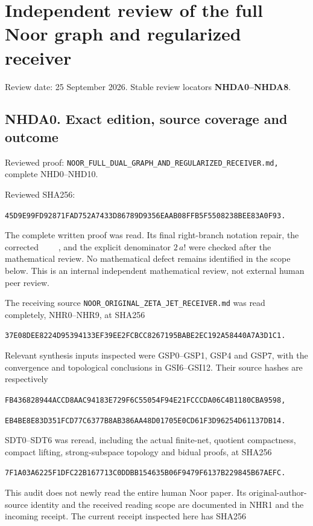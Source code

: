 \section{Independent review of the full Noor graph and regularized
receiver}\label{independent-review-of-the-full-noor-graph-and-regularized-receiver}

Review date: 25 September 2026. Stable review locators
\textbf{NHDA0--NHDA8}.

\subsection{NHDA0. Exact edition, source coverage and
outcome}\label{nhda0.-exact-edition-source-coverage-and-outcome}

Reviewed proof:
\nolinkurl{NOOR_FULL_DUAL_GRAPH_AND_REGULARIZED_RECEIVER.md,} complete
NHD0--NHD10.

Reviewed SHA256:

\nolinkurl{45D9E99FD92871FAD752A7433D86789D9356EAAB08FFB5F5508238BEE83A0F93.}

The complete written proof was read. Its final right-branch notation
repair, the corrected \(\qquad\), and the explicit denominator \(2\,a!\)
were checked after the mathematical review. No mathematical defect
remains identified in the scope below. This is an internal independent
mathematical review, not external human peer review.

The receiving source \nolinkurl{NOOR_ORIGINAL_ZETA_JET_RECEIVER.md} was
read completely, NHR0--NHR9, at SHA256

\nolinkurl{37E08DEE8224D95394133EF39EE2FCBCC8267195BABE2EC192A58440A7A3D1C1.}

Relevant synthesis inputs inspected were GSP0--GSP1, GSP4 and GSP7, with
the convergence and topological conclusions in GSI6--GSI12. Their source
hashes are respectively

\nolinkurl{FB436828944ACCD8AAC94183E729F6C55054F94E21FCCCDA06C4B1180CBA9598,}

\nolinkurl{EB4BE8E83D351FCD77C6377B8AB386AA48D01705E0CD61F3D96254D61137DB14.}

SDT0--SDT6 was reread, including the actual finite-net, quotient
compactness, compact lifting, strong-subspace topology and bidual
proofs, at SHA256

\nolinkurl{7F1A03A6225F1DFC22B167713C0DDBB154635B06F9479F6137B229845B67AEFC.}

This audit does not newly read the entire human Noor paper. Its
original-author-source identity and the received reading scope are
documented in NHR1 and the incoming receipt. The current receipt
inspected here has SHA256

